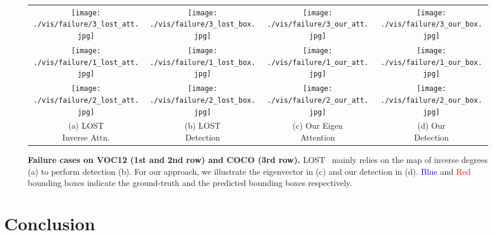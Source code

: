 \documentclass[twocolumn]{article}
\begin{document}
\begin{figure}[!t]
\centering
\begin{tabular}{c@{\hskip 3pt}c@{\hskip 3pt}c@{\hskip 3pt}c}

        \texttt{[image: ./vis/failure/3\_lost\_att.jpg]} &
		\texttt{[image: ./vis/failure/3\_lost\_box.jpg]} &
		\texttt{[image: ./vis/failure/3\_our\_att.jpg]} &
		\texttt{[image: ./vis/failure/3\_our\_box.jpg]}\\	
		
		\texttt{[image: ./vis/failure/1\_lost\_att.jpg]} &
		\texttt{[image: ./vis/failure/1\_lost\_box.jpg]} &
		\texttt{[image: ./vis/failure/1\_our\_att.jpg]} &
		\texttt{[image: ./vis/failure/1\_our\_box.jpg]}\\
		
		\texttt{[image: ./vis/failure/2\_lost\_att.jpg]} &
		\texttt{[image: ./vis/failure/2\_lost\_box.jpg]} &
		\texttt{[image: ./vis/failure/2\_our\_att.jpg]} &
		\texttt{[image: ./vis/failure/2\_our\_box.jpg]}\\
        \makecell{(a) LOST \\ Inverse Attn.} & \makecell{(b) LOST \\Detection} & \makecell{(c) Our Eigen \\ Attention} & \makecell{(d) Our \\Detection} \\ 
\end{tabular}

\caption{\textbf{Failure cases on VOC12 (1st and 2nd row) and COCO (3rd row).} LOST~\cite{simeoni2021localizing}  mainly relies on the map of inverse degrees (a) to perform detection (b). For our approach, we illustrate the eigenvector in (c) and our detection in (d). \textcolor{blue}{Blue} and \textcolor{red}{Red} bounding boxes indicate the ground-truth and the predicted bounding boxes respectively.}
\label{fig:failure}

\end{figure}

\section{Conclusion}
\end{document}
